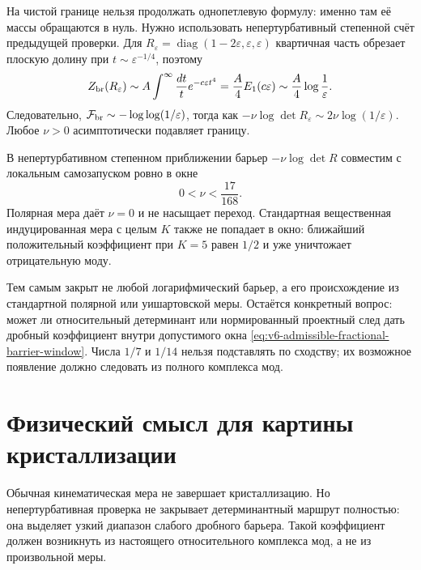 На чистой границе нельзя продолжать однопетлевую формулу: именно там её
массы обращаются в нуль. Нужно использовать непертурбативный степенной
счёт предыдущей проверки. Для
$R_\varepsilon=\operatorname{diag}(1-2\varepsilon,
\varepsilon,\varepsilon)$ квартичная часть обрезает плоскую долину при
$t\sim\varepsilon^{-1/4}$, поэтому
\begin{equation}
 Z_{\rm br}(R_\varepsilon)
 \sim A\int^\infty\frac{dt}{t}e^{-c\varepsilon t^4}
 =\frac A4 E_1(c\varepsilon)
 \sim\frac A4\log\frac1\varepsilon.
 \label{eq:v6-nonperturbative-boundary-log}
\end{equation}
Следовательно,
$\mathcal F_{\rm br}\sim-\log\log(1/\varepsilon)$, тогда как
$-\nu\log\det R_\varepsilon\sim2\nu\log(1/\varepsilon)$.
Любое $\nu>0$ асимптотически подавляет границу.

\begin{theorem}
В непертурбативном степенном приближении барьер
$-\nu\log\det R$ совместим с локальным самозапуском ровно в окне
\begin{equation}
 \boxed{0<\nu<\frac{17}{168}}.
 \label{eq:v6-admissible-fractional-barrier-window}
\end{equation}
Полярная мера даёт $\nu=0$ и не насыщает переход. Стандартная вещественная
индуцированная мера с целым $K$ также не попадает в окно: ближайший
положительный коэффициент при $K=5$ равен $1/2$ и уже уничтожает
отрицательную моду.
\end{theorem}

Тем самым закрыт не любой логарифмический барьер, а его происхождение из
стандартной полярной или уишартовской меры. Остаётся конкретный вопрос:
может ли относительный детерминант или нормированный проектный след дать
дробный коэффициент внутри допустимого окна
\eqref{eq:v6-admissible-fractional-barrier-window}.
Числа $1/7$ и $1/14$ нельзя подставлять по сходству; их возможное появление
должно следовать из полного комплекса мод.

\section{Физический смысл для картины кристаллизации}

Обычная кинематическая мера не завершает кристаллизацию. Но
непертурбативная проверка не закрывает детерминантный маршрут полностью:
она выделяет узкий диапазон слабого дробного барьера. Такой коэффициент
должен возникнуть из настоящего относительного комплекса мод, а не из
произвольной меры.

